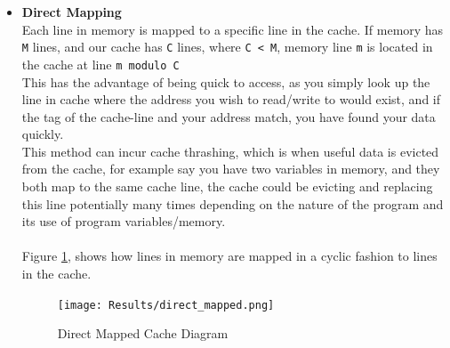 \documentclass[bsc,frontabs,twoside,singlespacing,parskip,deptreport]{infthesis}     %
\begin{document}
\begin{itemize}
    \item{
        {\bf Direct Mapping} \\
        Each line in memory is mapped to a specific line in the cache. If memory has \texttt{M} lines, and our cache has \texttt{C} lines, where \texttt{C < M}, memory line \texttt{m} is located in the cache at line \texttt{m modulo C}\\
        This has the advantage of being quick to access, as you simply look up the line in cache where the address you wish to read/write to would exist, and if the tag of the cache-line and your address match, you have found your data quickly. \\
        This method can incur cache thrashing, which is when useful data is evicted from the cache, for example say you have two variables in memory, and they both map to the same cache line, the cache could be evicting and replacing this line potentially many times depending on the nature of the program and its use of program variables/memory. \\
        \\
        Figure \ref{fig:dir-map}, shows how lines in memory are mapped in a cyclic fashion to lines in the cache.
    }
    \begin{figure}[h]
        \texttt{[image: Results/direct\_mapped.png]}
        \centering
        \caption{Direct Mapped Cache Diagram}
        \label{fig:dir-map}
    \end{figure}
    

\end{itemize}
\end{document}
